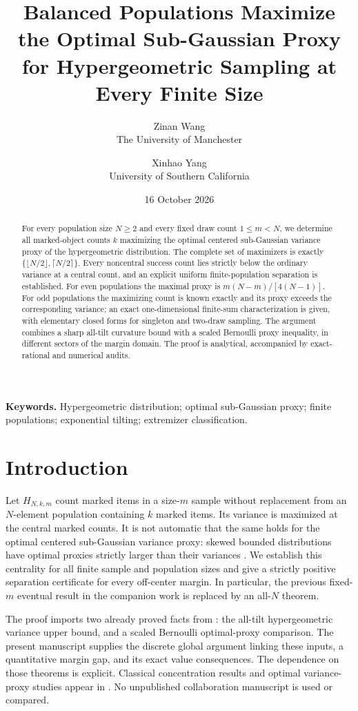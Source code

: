 \documentclass[11pt]{article}
\title{Balanced Populations Maximize the Optimal Sub-Gaussian Proxy\\for Hypergeometric Sampling at Every Finite Size}
\author{Zinan Wang\\{\small The University of Manchester}\and Xinhao Yang\\{\small University of Southern California}}
\date{16 October 2026}
\numberwithin{equation}{section}
\theoremstyle{remark}\newtheorem{remark}[theorem]{Remark}
\begin{document}
\maketitle
\begin{abstract}
For every population size $N\ge2$ and every fixed draw count $1\le m<N$,
we determine all marked-object counts $k$ maximizing the optimal centered
sub-Gaussian variance proxy of the hypergeometric distribution.
The complete set of maximizers is exactly
$\{\lfloor N/2\rfloor,\lceil N/2\rceil\}$.
Every noncentral success count lies strictly below the ordinary variance
at a central count, and an explicit uniform finite-population separation
is established. For even populations the maximal proxy is
$m(N-m)/[4(N-1)]$. For odd populations the maximizing count is known
exactly and its proxy exceeds the corresponding variance; an exact
one-dimensional finite-sum characterization is given, with elementary
closed forms for singleton and two-draw sampling.
The argument combines a sharp all-tilt curvature bound with a scaled
Bernoulli proxy inequality, in different sectors of the margin domain.
The proof is analytical, accompanied by exact-rational and numerical audits.
\end{abstract}
\noindent\textbf{Keywords.} Hypergeometric distribution; optimal sub-Gaussian
proxy; finite populations; exponential tilting; extremizer classification.

\section{Introduction}
Let $H_{N,k,m}$ count marked items in a size-$m$ sample without replacement
from an $N$-element population containing $k$ marked items. Its variance is
maximized at the central marked counts. It is not automatic that the same
holds for the optimal centered sub-Gaussian variance proxy: skewed bounded
distributions have optimal proxies strictly larger than their variances
\cite{Arbel}. We establish this centrality for all finite sample and population
sizes and give a strictly positive separation certificate for every off-center
margin. In particular, the previous fixed-$m$ eventual result in the
companion work \cite{Wang} is replaced by an all-$N$ theorem.

The proof imports two already proved facts from \cite{Wang}: the all-tilt
hypergeometric variance upper bound, and a scaled Bernoulli optimal-proxy
comparison. The present manuscript supplies the discrete global argument
linking these inputs, a quantitative margin gap, and its exact value consequences.
The dependence on those theorems is explicit. Classical concentration results
and optimal variance-proxy studies appear in \cite{Hoeffding,Serfling,GW,BM,Arbel,ThreeMass}.
No unpublished collaboration manuscript is used or compared.
\end{document}
